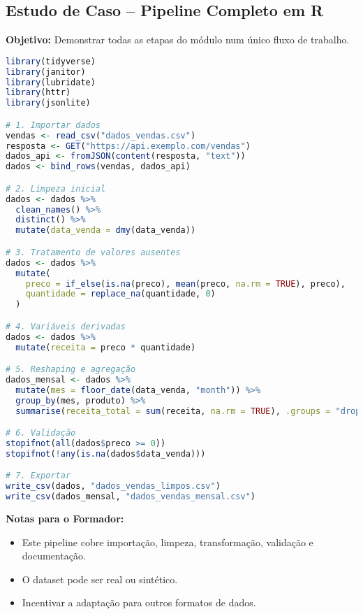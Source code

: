 \subsection{\textcolor{subsectionblue}{Estudo de Caso – Pipeline Completo em R}}
\textbf{Objetivo:} Demonstrar todas as etapas do módulo num único fluxo de trabalho.

\begin{lstlisting}[language=R]
library(tidyverse)
library(janitor)
library(lubridate)
library(httr)
library(jsonlite)

# 1. Importar dados
vendas <- read_csv("dados_vendas.csv")
resposta <- GET("https://api.exemplo.com/vendas")
dados_api <- fromJSON(content(resposta, "text"))
dados <- bind_rows(vendas, dados_api)

# 2. Limpeza inicial
dados <- dados %>%
  clean_names() %>%
  distinct() %>%
  mutate(data_venda = dmy(data_venda))

# 3. Tratamento de valores ausentes
dados <- dados %>%
  mutate(
    preco = if_else(is.na(preco), mean(preco, na.rm = TRUE), preco),
    quantidade = replace_na(quantidade, 0)
  )

# 4. Variáveis derivadas
dados <- dados %>%
  mutate(receita = preco * quantidade)

# 5. Reshaping e agregação
dados_mensal <- dados %>%
  mutate(mes = floor_date(data_venda, "month")) %>%
  group_by(mes, produto) %>%
  summarise(receita_total = sum(receita, na.rm = TRUE), .groups = "drop")

# 6. Validação
stopifnot(all(dados$preco >= 0))
stopifnot(!any(is.na(dados$data_venda)))

# 7. Exportar
write_csv(dados, "dados_vendas_limpos.csv")
write_csv(dados_mensal, "dados_vendas_mensal.csv")
\end{lstlisting}

\textbf{Notas para o Formador:}
\begin{itemize}
  \item Este pipeline cobre importação, limpeza, transformação, validação e documentação.
  \item O dataset pode ser real ou sintético.
  \item Incentivar a adaptação para outros formatos de dados.
\end{itemize}

